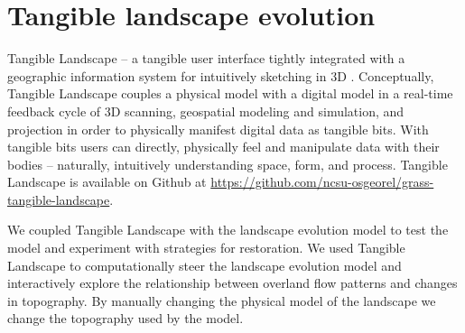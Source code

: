 \documentclass[final,3p,times,twocolumn]{elsarticle}
\begin{document}

\clearpage
\section{Tangible landscape evolution}

Tangible Landscape -- a tangible user interface tightly integrated with a geographic information system for intuitively sketching in 3D \cite{petrasova2015}. Conceptually, Tangible Landscape couples a physical model with a digital model in a real-time feedback cycle of 3D scanning, geospatial modeling and simulation, and projection in order to physically manifest digital data as tangible bits. With tangible bits users can directly, physically feel and manipulate data with their bodies -- naturally, intuitively understanding space, form, and process. Tangible Landscape is available on Github at \url{https://github.com/ncsu-osgeorel/grass-tangible-landscape}.

We coupled Tangible Landscape with the landscape evolution model to test the model and experiment with strategies for restoration. 
We used Tangible Landscape to computationally steer the landscape evolution model and interactively explore the relationship between overland flow patterns and changes in topography. By manually changing the physical model of the landscape 
we change the topography used by the model.
\end{document}
